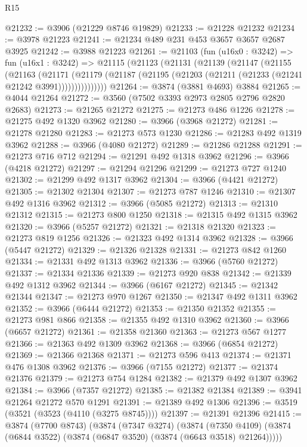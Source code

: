\begin{lexlean}{R15}
\begin{coremodule}
@21232 := @3906 (@21229 @8746 @19829)
@21233 := @21228 @21232
@21234 := @3978 @21223
@21241 := @21234 @489 @231 @453 @3657 @3657 @2687 @3925
@21242 := @3988 @21223
@21261 := @21103
    (fun (u16x0 : @3242) =>
    fun (u16x1 : @3242) =>
    @21115
      (@21123
        (@21131
          (@21139
            (@21147
              (@21155
                (@21163
                  (@21171
                    (@21179
                      (@21187 (@21195 (@21203 (@21211 (@21233 (@21241 @21242 @3991)))))))))))))))
@21264 := @3874 (@3881 @4693) @3884
@21265 := @4044 @21264
@21272 := @3560 (@7502 @3393 @2973 @2805 @2796 @2820 @2683)
@21273 := @21265 @21272
@21275 := @21273 @486 @1226
@21278 := @21275 @492 @1320 @3962
@21280 := @3966 (@3968 @21272)
@21281 := @21278 @21280
@21283 := @21273 @573 @1230
@21286 := @21283 @492 @1319 @3962
@21288 := @3966 (@4080 @21272)
@21289 := @21286 @21288
@21291 := @21273 @716 @712
@21294 := @21291 @492 @1318 @3962
@21296 := @3966 (@4218 @21272)
@21297 := @21294 @21296
@21299 := @21273 @727 @1240
@21302 := @21299 @492 @1317 @3962
@21304 := @3966 (@4421 @21272)
@21305 := @21302 @21304
@21307 := @21273 @787 @1246
@21310 := @21307 @492 @1316 @3962
@21312 := @3966 (@5085 @21272)
@21313 := @21310 @21312
@21315 := @21273 @800 @1250
@21318 := @21315 @492 @1315 @3962
@21320 := @3966 (@5257 @21272)
@21321 := @21318 @21320
@21323 := @21273 @819 @1256
@21326 := @21323 @492 @1314 @3962
@21328 := @3966 (@5447 @21272)
@21329 := @21326 @21328
@21331 := @21273 @842 @1260
@21334 := @21331 @492 @1313 @3962
@21336 := @3966 (@5760 @21272)
@21337 := @21334 @21336
@21339 := @21273 @920 @838
@21342 := @21339 @492 @1312 @3962
@21344 := @3966 (@6167 @21272)
@21345 := @21342 @21344
@21347 := @21273 @970 @1267
@21350 := @21347 @492 @1311 @3962
@21352 := @3966 (@6444 @21272)
@21353 := @21350 @21352
@21355 := @21273 @981 @866
@21358 := @21355 @492 @1310 @3962
@21360 := @3966 (@6657 @21272)
@21361 := @21358 @21360
@21363 := @21273 @567 @1277
@21366 := @21363 @492 @1309 @3962
@21368 := @3966 (@6854 @21272)
@21369 := @21366 @21368
@21371 := @21273 @596 @413
@21374 := @21371 @476 @1308 @3962
@21376 := @3966 (@7155 @21272)
@21377 := @21374 @21376
@21379 := @21273 @754 @1284
@21382 := @21379 @492 @1307 @3962
@21384 := @3966 (@7357 @21272)
@21385 := @21382 @21384
@21389 := @3941 @21264 @21272 @570 @1291
@21391 := @21389 @492 @1306
@21396 := @3519 (@3521 (@3523 (@4110 (@3275 @8745))))
@21397 := @21391 @21396
@21415 := @3874
    (@7700 @8743)
    (@3874
      (@7347 @3274)
      (@3874
        (@7350 @4109)
        (@3874 (@6844 @3522) (@3874 (@6847 @3520) (@3874 (@6643 @3518) @21264)))))

\end{coremodule}
\end{lexlean}
